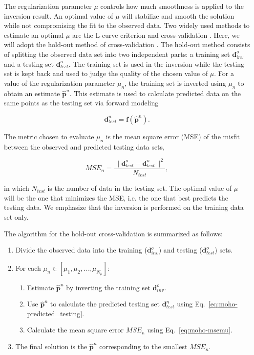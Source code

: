 The regularization parameter $\mu$ controls how much smoothness is applied to
the inversion result.
An optimal value of $\mu$ will stabilize and smooth the solution while not
compromising the fit to the observed data.
Two widely used methods to estimate an optimal $\mu$ are
the L-curve criterion and cross-validation \citep{hansen1992}.
Here, we will adopt the hold-out method of cross-validation \citep{kim2009}.
The hold-out method consists of splitting the observed data set into two
independent parts:
a training set $\mathbf{d}^o_{inv}$
and a testing set $\mathbf{d}^o_{test}$.
The training set is used in the inversion
while the testing set is kept back
and used to judge the quality of the chosen value of $\mu$.
For a value of the regularization parameter $\mu_n$,
the training set is inverted using $\mu_n$
to obtain an estimate $\mathbf{\hat{p}}^n$.
This estimate is used to calculate predicted data
on the same points as the testing set
via forward modeling

\begin{equation}
    \mathbf{d}_{test}^n = \mathbf{f}(\mathbf{\hat{p}}^n).
    \label{eq:moho-predicted_testing}
\end{equation}

The metric chosen to evaluate $\mu_n$ is
the mean square error (MSE) of the misfit
between the observed and predicted testing data sets,

\begin{equation}
    MSE_n = \dfrac{\|\mathbf{d}^o_{test} - \mathbf{d}^n_{test}\|^2}{N_{test}},
    \label{eq:moho-msemu}
\end{equation}

\noindent
in which $N_{test}$ is the number of data in the testing set.
The optimal value of $\mu$ will be the one that minimizes the MSE,
i.e. the one that best predicts the testing data.
We emphasize that the inversion is performed on the training data set only.

The algorithm for the hold-out cross-validation is summarized as follows:

\begin{enumerate}
    \item Divide the observed data into
        the training ($\mathbf{d}^o_{inv}$)
        and testing ($\mathbf{d}^o_{test}$) sets.
    \item For each $\mu_n \in [\mu_1, \mu_2, \ldots, \mu_{N_{\mu}}]$:
    \begin{enumerate}
        \item Estimate $\mathbf{\hat{p}}^n$ by inverting the training set
            $\mathbf{d}^o_{inv}$.
        \item Use $\mathbf{\hat{p}}^n$ to calculate the predicted testing set
            $\mathbf{d}^n_{test}$ using Eq.~\ref{eq:moho-predicted_testing}.
        \item Calculate the mean square error $MSE_n$ using Eq.~\ref{eq:moho-msemu}.
    \end{enumerate}
    \item The final solution is the $\mathbf{\hat{p}}^n$ corresponding to the
        smallest $MSE_n$.
\end{enumerate}

